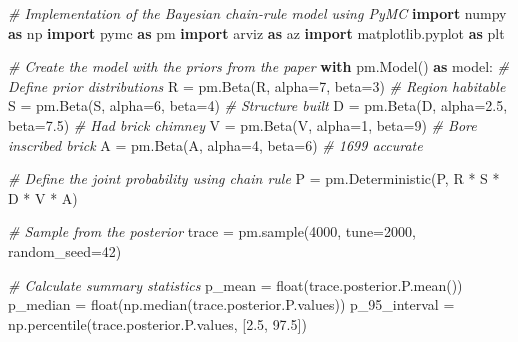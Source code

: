 \documentclass[
  11pt,
]{article}
\newenvironment{Shaded}{}{}
\newcommand{\BuiltInTok}[1]{\textcolor[rgb]{0.00,0.50,0.00}{#1}}
\newcommand{\CommentTok}[1]{\textcolor[rgb]{0.38,0.63,0.69}{\textit{#1}}}
\newcommand{\ControlFlowTok}[1]{\textcolor[rgb]{0.00,0.44,0.13}{\textbf{#1}}}
\newcommand{\DecValTok}[1]{\textcolor[rgb]{0.25,0.63,0.44}{#1}}
\newcommand{\FloatTok}[1]{\textcolor[rgb]{0.25,0.63,0.44}{#1}}
\newcommand{\ImportTok}[1]{\textcolor[rgb]{0.00,0.50,0.00}{\textbf{#1}}}
\newcommand{\NormalTok}[1]{#1}
\newcommand{\OperatorTok}[1]{\textcolor[rgb]{0.40,0.40,0.40}{#1}}
\newcommand{\StringTok}[1]{\textcolor[rgb]{0.25,0.44,0.63}{#1}}
\begin{document}
\begin{Shaded}
\begin{Highlighting}[]
\CommentTok{\# Implementation of the Bayesian chain{-}rule model using PyMC}
\ImportTok{import}\NormalTok{ numpy }\ImportTok{as}\NormalTok{ np}
\ImportTok{import}\NormalTok{ pymc }\ImportTok{as}\NormalTok{ pm}
\ImportTok{import}\NormalTok{ arviz }\ImportTok{as}\NormalTok{ az}
\ImportTok{import}\NormalTok{ matplotlib.pyplot }\ImportTok{as}\NormalTok{ plt}

\CommentTok{\# Create the model with the priors from the paper}
\ControlFlowTok{with}\NormalTok{ pm.Model() }\ImportTok{as}\NormalTok{ model:}
    \CommentTok{\# Define prior distributions}
\NormalTok{    R }\OperatorTok{=}\NormalTok{ pm.Beta(}\StringTok{\textquotesingle{}R\textquotesingle{}}\NormalTok{, alpha}\OperatorTok{=}\DecValTok{7}\NormalTok{, beta}\OperatorTok{=}\DecValTok{3}\NormalTok{)         }\CommentTok{\# Region habitable}
\NormalTok{    S }\OperatorTok{=}\NormalTok{ pm.Beta(}\StringTok{\textquotesingle{}S\textquotesingle{}}\NormalTok{, alpha}\OperatorTok{=}\DecValTok{6}\NormalTok{, beta}\OperatorTok{=}\DecValTok{4}\NormalTok{)         }\CommentTok{\# Structure built}
\NormalTok{    D }\OperatorTok{=}\NormalTok{ pm.Beta(}\StringTok{\textquotesingle{}D\textquotesingle{}}\NormalTok{, alpha}\OperatorTok{=}\FloatTok{2.5}\NormalTok{, beta}\OperatorTok{=}\FloatTok{7.5}\NormalTok{)     }\CommentTok{\# Had brick chimney}
\NormalTok{    V }\OperatorTok{=}\NormalTok{ pm.Beta(}\StringTok{\textquotesingle{}V\textquotesingle{}}\NormalTok{, alpha}\OperatorTok{=}\DecValTok{1}\NormalTok{, beta}\OperatorTok{=}\DecValTok{9}\NormalTok{)         }\CommentTok{\# Bore inscribed brick}
\NormalTok{    A }\OperatorTok{=}\NormalTok{ pm.Beta(}\StringTok{\textquotesingle{}A\textquotesingle{}}\NormalTok{, alpha}\OperatorTok{=}\DecValTok{4}\NormalTok{, beta}\OperatorTok{=}\DecValTok{6}\NormalTok{)         }\CommentTok{\# 1699 accurate}
    
    \CommentTok{\# Define the joint probability using chain rule}
\NormalTok{    P }\OperatorTok{=}\NormalTok{ pm.Deterministic(}\StringTok{\textquotesingle{}P\textquotesingle{}}\NormalTok{, R }\OperatorTok{*}\NormalTok{ S }\OperatorTok{*}\NormalTok{ D }\OperatorTok{*}\NormalTok{ V }\OperatorTok{*}\NormalTok{ A)}
    
    \CommentTok{\# Sample from the posterior}
\NormalTok{    trace }\OperatorTok{=}\NormalTok{ pm.sample(}\DecValTok{4000}\NormalTok{, tune}\OperatorTok{=}\DecValTok{2000}\NormalTok{, random\_seed}\OperatorTok{=}\DecValTok{42}\NormalTok{)}

\CommentTok{\# Calculate summary statistics}
\NormalTok{p\_mean }\OperatorTok{=} \BuiltInTok{float}\NormalTok{(trace.posterior.P.mean())}
\NormalTok{p\_median }\OperatorTok{=} \BuiltInTok{float}\NormalTok{(np.median(trace.posterior.P.values))}
\NormalTok{p\_95\_interval }\OperatorTok{=}\NormalTok{ np.percentile(trace.posterior.P.values, [}\FloatTok{2.5}\NormalTok{, }\FloatTok{97.5}\NormalTok{])}
\end{Highlighting}
\end{Shaded}
\end{document}
